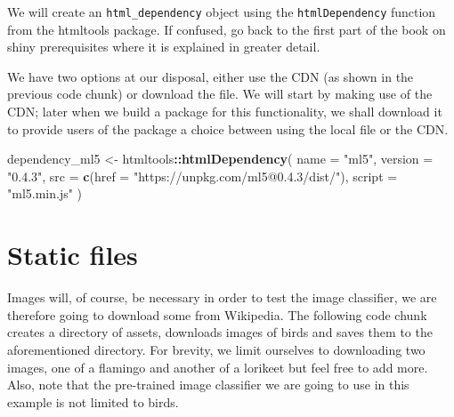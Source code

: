 \documentclass[
]{krantz}
\makeatletter
\newenvironment{Shaded}{\begin{snugshade}}{\end{snugshade}}
\newcommand{\DataTypeTok}[1]{\textcolor[rgb]{0.27,0.27,0.27}{#1}}
\newcommand{\KeywordTok}[1]{\textcolor[rgb]{0.27,0.27,0.27}{\textbf{#1}}}
\newcommand{\NormalTok}[1]{#1}
\newcommand{\OperatorTok}[1]{\textcolor[rgb]{0.43,0.43,0.43}{\textbf{#1}}}
\newcommand{\StringTok}[1]{\textcolor[rgb]{0.5,0.5,0.5}{#1}}
\newenvironment{kframe}{%
\medskip{}
\setlength{\fboxsep}{.8em}
 \def\at@end@of@kframe{}%
 \ifinner\ifhmode%
  \def\at@end@of@kframe{\end{minipage}}%
  \begin{minipage}{\columnwidth}%
 \fi\fi%
 \def\FrameCommand##1{\hskip\@totalleftmargin \hskip-\fboxsep
 \colorbox{shadecolor}{##1}\hskip-\fboxsep
     \hskip-\linewidth \hskip-\@totalleftmargin \hskip\columnwidth}%
 \MakeFramed {\advance\hsize-\width
   \@totalleftmargin\z@ \linewidth\hsize
   \@setminipage}}%
 {\par\unskip\endMakeFramed%
 \at@end@of@kframe}
\renewenvironment{Shaded}{\begin{kframe}}{\end{kframe}}
\makeatother
\begin{document}
We will create an \texttt{html\_dependency} object using the \texttt{htmlDependency} function from the htmltools package. If confused, go back to the first part of the book on shiny prerequisites where it is explained in greater detail.

We have two options at our disposal, either use the CDN (as shown in the previous code chunk) or download the file. We will start by making use of the CDN; later when we build a package for this functionality, we shall download it to provide users of the package a choice between using the local file or the CDN.

\begin{Shaded}
\begin{Highlighting}[]
\NormalTok{dependency\_ml5 <{-}}\StringTok{ }\NormalTok{htmltools}\OperatorTok{::}\KeywordTok{htmlDependency}\NormalTok{(}
  \DataTypeTok{name =} \StringTok{"ml5"}\NormalTok{,}
  \DataTypeTok{version =} \StringTok{"0.4.3"}\NormalTok{,}
  \DataTypeTok{src =} \KeywordTok{c}\NormalTok{(}\DataTypeTok{href =} \StringTok{"https://unpkg.com/ml5@0.4.3/dist/"}\NormalTok{),}
  \DataTypeTok{script =} \StringTok{"ml5.min.js"}
\NormalTok{)}
\end{Highlighting}
\end{Shaded}

\hypertarget{shiny-complete-images}{%
\section{Static files}\label{shiny-complete-images}}

Images will, of course, be necessary in order to test the image classifier, we are therefore going to download some from Wikipedia. The following code chunk creates a directory of assets, downloads images of birds and saves them to the aforementioned directory. For brevity, we limit ourselves to downloading two images, one of a flamingo and another of a lorikeet but feel free to add more. Also, note that the pre-trained image classifier we are going to use in this example is not limited to birds.
\end{document}
